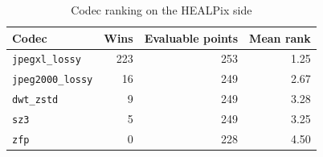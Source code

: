 \begin{table}[t]
\centering
\caption{Codec ranking on the HEALPix side}
\label{tab:codec_ranking}
\footnotesize
\setlength{\tabcolsep}{3pt}
\begin{tabular}{lrrr}
\toprule
Codec & Wins & Evaluable points & Mean rank \\
\midrule
\texttt{jpegxl\_lossy} & 223 & 253 & 1.25 \\
\texttt{jpeg2000\_lossy} & 16 & 249 & 2.67 \\
\texttt{dwt\_zstd} & 9 & 249 & 3.28 \\
\texttt{sz3} & 5 & 249 & 3.25 \\
\texttt{zfp} & 0 & 228 & 4.50 \\
\bottomrule
\end{tabular}
\end{table}
